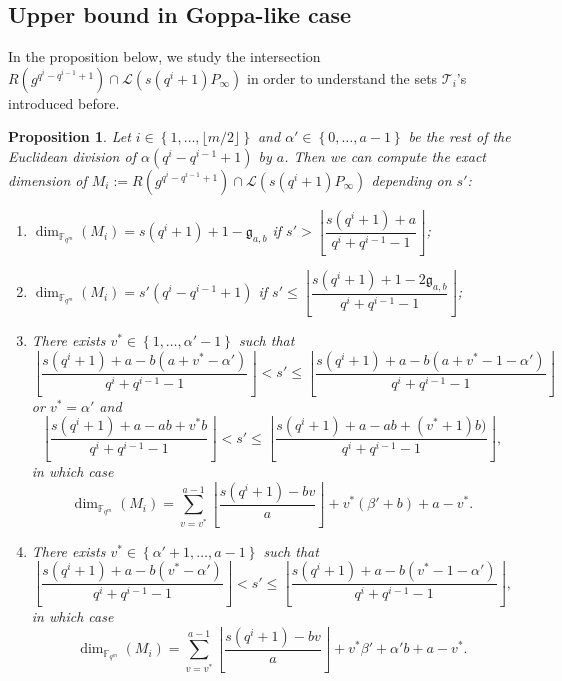 \documentclass[a4paper]{article}
\newtheorem{proposition}[thm]{Proposition}
\theoremstyle{definition}
\theoremstyle{remark}
\newcommand{\calL}{\mathcal{L}}
\newcommand{\calT}{\mathcal{T}}
\newcommand{\fqm}{\mathbb{F}_{q^m}}
\newcommand{\set}[1]{\left\{#1\right\}}
\begin{document}

\subsection{Upper bound in Goppa-like case}

In the proposition below, we study the intersection $R(g^{q^{i}-q^{i-1}+1}) \cap \calL(s(q^i+1)P_\infty)$ in order to understand the sets $\calT_i$'s introduced before.

\begin{proposition} \label{prop:dim_M_i's}
Let $i \in \set{1,\dots,\lfloor m/2 \rfloor}$ and
     $\alpha' \in \set{0,\dots,a-1}$ be the rest of the Euclidean division of $\alpha (q^i-q^{i-1}+1)$ by $a$. Then we can compute the exact dimension of $M_i := R(g^{q^{i}-q^{i-1}+1}) \cap \calL(s(q^i+1)P_\infty)$ depending on $s'$:
    \begin{enumerate}
        \item $\dim_{\fqm}(M_i) = s(q^i+1)+1-\mathfrak{g}_{a,b}$ if $s' > \left\lfloor \dfrac{s(q^i+1)+a}{q^i+q^{i-1}-1}\right\rfloor$;
        
        \item $\dim_{\fqm}(M_i) = s'(q^i-q^{i-1}+1)$ if $s' \leq \left\lfloor \dfrac{s(q^i+1)+1-2\mathfrak{g}_{a,b}}{q^i+q^{i-1}-1}\right\rfloor$;
        
        \item There exists $v^* \in \set{1,\dots,\alpha'-1}$ such that
        $$ \left\lfloor \dfrac{s(q^i+1)+a-b(a+v^*-\alpha')}{q^i+q^{i-1}-1}\right\rfloor < s' \leq  \left\lfloor \dfrac{s(q^i+1)+a-b(a+v^*-1-\alpha')}{q^i+q^{i-1}-1}\right\rfloor$$ or $v^* = \alpha'$ and 
        $$\left\lfloor \dfrac{s(q^i+1)+a-ab+v^*b}{q^i+q^{i-1}-1}\right\rfloor < s' \leq  \left\lfloor \dfrac{s(q^i+1)+a-ab+(v^*+1)b)}{q^i+q^{i-1}-1}\right\rfloor,$$
        in which case 
          $$\dim_{\fqm}(M_i) = \sum\limits_{v=v^*}^{a-1} \left\lfloor \dfrac{s(q^i+1)-bv}{a} \right\rfloor + v^*(\beta'+b) + a-v^*.$$
        
        \item There exists $v^* \in \set{\alpha'+1,\dots,a-1}$ such that
        $$ \left\lfloor \dfrac{s(q^i+1)+a-b(v^*-\alpha')}{q^i+q^{i-1}-1}\right\rfloor < s' \leq  \left\lfloor \dfrac{s(q^i+1)+a-b(v^*-1-\alpha')}{q^i+q^{i-1}-1}\right\rfloor,$$
        in which case 
        $$\dim_{\fqm}(M_i) = \sum\limits_{v=v^*}^{a-1} \left\lfloor \dfrac{s(q^i+1)-bv}{a} \right\rfloor + v^*\beta' + \alpha'b +a-v^*.$$
    \end{enumerate}
\end{proposition}
\end{document}
